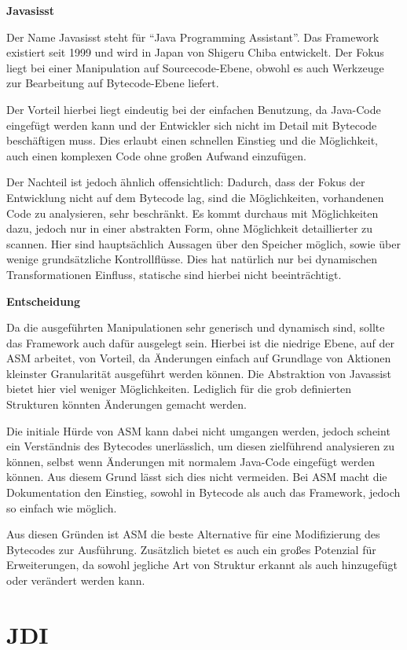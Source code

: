 \textbf{Javasisst}

Der Name Javasisst steht für "`Java Programming Assistant"'. Das Framework existiert seit 1999 und wird in Japan von Shigeru Chiba entwickelt. Der Fokus liegt bei einer Manipulation auf Sourcecode-Ebene, obwohl es auch Werkzeuge zur Bearbeitung auf Bytecode-Ebene liefert.

Der Vorteil hierbei liegt eindeutig bei der einfachen Benutzung, da Java-Code eingefügt werden kann und der Entwickler sich nicht im Detail mit Bytecode beschäftigen muss. Dies erlaubt einen schnellen Einstieg und die Möglichkeit, auch einen komplexen Code ohne großen Aufwand einzufügen.

Der Nachteil ist jedoch ähnlich offensichtlich: Dadurch, dass der Fokus der Entwicklung nicht auf dem Bytecode lag, sind die Möglichkeiten, vorhandenen Code zu analysieren, sehr beschränkt. Es kommt durchaus mit Möglichkeiten dazu, jedoch nur in einer abstrakten Form, ohne Möglichkeit detaillierter zu scannen. Hier sind hauptsächlich Aussagen über den Speicher möglich, sowie über wenige grundsätzliche Kontrollflüsse. Dies hat natürlich nur bei dynamischen Transformationen Einfluss, statische sind hierbei nicht beeinträchtigt.

\textbf{Entscheidung}

Da die ausgeführten Manipulationen sehr generisch und dynamisch sind, sollte das Framework auch dafür ausgelegt sein. Hierbei ist die niedrige Ebene, auf der ASM arbeitet, von Vorteil, da Änderungen einfach auf Grundlage von Aktionen kleinster Granularität ausgeführt werden können. Die Abstraktion von Javassist bietet hier viel weniger Möglichkeiten. Lediglich für die grob definierten Strukturen könnten Änderungen gemacht werden.

Die initiale Hürde von ASM kann dabei nicht umgangen werden, jedoch scheint ein Verständnis des Bytecodes unerlässlich, um diesen zielführend analysieren zu können, selbst wenn Änderungen mit normalem Java-Code eingefügt werden können. Aus diesem Grund lässt sich dies nicht vermeiden. Bei ASM macht die Dokumentation den Einstieg, sowohl in Bytecode als auch das Framework, jedoch so einfach wie möglich.

Aus diesen Gründen ist ASM die beste Alternative für eine Modifizierung des Bytecodes zur Ausführung. Zusätzlich bietet es auch ein großes Potenzial für Erweiterungen, da sowohl jegliche Art von Struktur erkannt als auch hinzugefügt oder verändert werden kann.

\section{JDI} 


